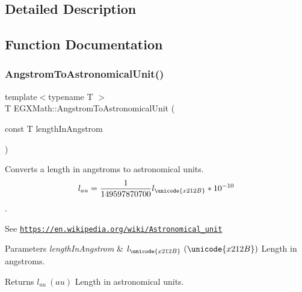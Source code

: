 \subsection{Detailed Description}


\subsection{Function Documentation}
\mbox{\label{group___e_g_x_math-_conversions-_length_conversions-_non-_s_i-_angstrom-_astronomical_ga3e524fe9f8c68c596264d4745b993be8}} 
\subsubsection{\texorpdfstring{Angstrom\+To\+Astronomical\+Unit()}{AngstromToAstronomicalUnit()}}
{\footnotesize\ttfamily template$<$typename T $>$ \\
T E\+G\+X\+Math\+::\+Angstrom\+To\+Astronomical\+Unit (\begin{DoxyParamCaption}\item[{const T}]{length\+In\+Angstrom }\end{DoxyParamCaption})}



Converts a length in angstroms to astronomical units. \[ l_{au}= \frac{1}{149597870700} l_{\unicode{x212B}} * 10^{-10} \]. 

See \href{https://en.wikipedia.org/wiki/Astronomical_unit}{\tt https\+://en.\+wikipedia.\+org/wiki/\+Astronomical\+\_\+unit} 
\begin{DoxyParams}{Parameters}
{\em length\+In\+Angstrom} & $ l_{\unicode{x212B}}\ (\unicode{x212B})$ Length in angstroms. \\
\hline
\end{DoxyParams}
\begin{DoxyReturn}{Returns}
$ l_{au}\ (au)$ Length in astronomical units. 
\end{DoxyReturn}
\mbox{\label{group___e_g_x_math-_conversions-_length_conversions-_non-_s_i-_angstrom-_astronomical_ga3ab9080fa3beaf5bbc5ea60323ff3634}} 
